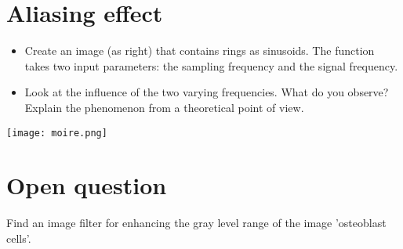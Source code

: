 \section{Aliasing effect}

\begin{qbox}
	\begin{minipage}{0.6\textwidth}
\begin{itemize}
\item Create an image (as right) that contains rings as sinusoids. The function takes two input parameters: the sampling frequency and the signal frequency.
\item Look at the influence of the two varying frequencies. What do you observe? Explain the phenomenon from a theoretical point of view.
\end{itemize}
\end{minipage}
\hfill
\begin{minipage}{0.35\textwidth}
	\texttt{[image: moire.png]}
\end{minipage}
\end{qbox}

\section{Open question}
Find an image filter for enhancing the gray level range of the image 'osteoblast cells'.

